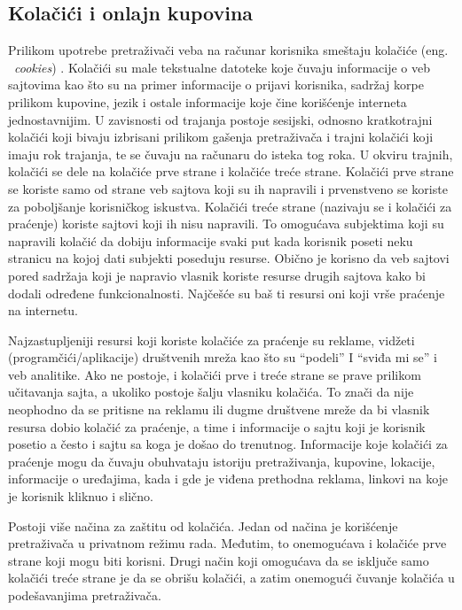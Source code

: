 \documentclass[a4paper]{article}
\begin{document}
\subsection{Kolačići i onlajn kupovina}

Prilikom upotrebe pretraživači veba na računar korisnika smeštaju kolačiće (eng. ~{\em cookies}) \cite{cookies1}. Kolačići su male tekstualne datoteke koje čuvaju informacije o veb sajtovima kao što su na primer informacije o prijavi korisnika, sadržaj korpe prilikom  kupovine, jezik i ostale informacije koje čine korišćenje interneta jednostavnijim. U zavisnosti od trajanja postoje sesijski, odnosno kratkotrajni kolačići koji bivaju izbrisani prilikom gašenja pretraživača i trajni kolačići koji imaju rok trajanja, te se čuvaju na računaru do isteka tog roka. U okviru trajnih, kolačići se dele na kolačiće prve strane i kolačiće treće strane.  Kolačići prve strane se koriste samo od strane veb sajtova koji su ih napravili i prvenstveno se koriste za poboljšanje korisničkog iskustva. Kolačići treće strane (nazivaju se i kolačići za praćenje) koriste  sajtovi koji ih nisu napravili. To omogućava subjektima koji su napravili kolačić da dobiju informacije svaki put kada korisnik poseti neku stranicu na kojoj dati subjekti poseduju resurse. Obično je korisno da veb sajtovi pored sadržaja koji je napravio vlasnik koriste resurse drugih sajtova kako bi dodali određene  funkcionalnosti. Najčešće su baš ti resursi oni koji vrše praćenje na internetu.
\par Najzastupljeniji resursi koji koriste kolačiće za praćenje su reklame, vidžeti (programčići/aplikacije) društvenih mreža kao što su “podeli” I “sviđa mi se” i veb analitike. Ako ne postoje, i kolačići prve i treće strane se prave prilikom učitavanja sajta, a ukoliko postoje šalju vlasniku kolačića. To znači da nije neophodno da se pritisne na reklamu ili dugme društvene mreže da bi vlasnik resursa dobio kolačić za praćenje, a time i informacije o sajtu koji je korisnik posetio a često i sajtu sa koga je došao do trenutnog. Informacije koje kolačići za praćenje mogu da čuvaju obuhvataju istoriju pretraživanja, kupovine, lokacije, informacije o uređajima, kada i gde je viđena prethodna reklama, linkovi na koje je korisnik kliknuo i slično. 
\par Postoji više načina za zaštitu od kolačića. Jedan od načina je korišćenje pretraživača u privatnom režimu rada. Međutim, to onemogućava i kolačiće prve strane koji mogu biti korisni. Drugi način koji omogućava da se isključe samo kolačići treće strane je da se obrišu kolačići, a zatim onemogući čuvanje kolačića u podešavanjima pretraživača. 
\end{document}
